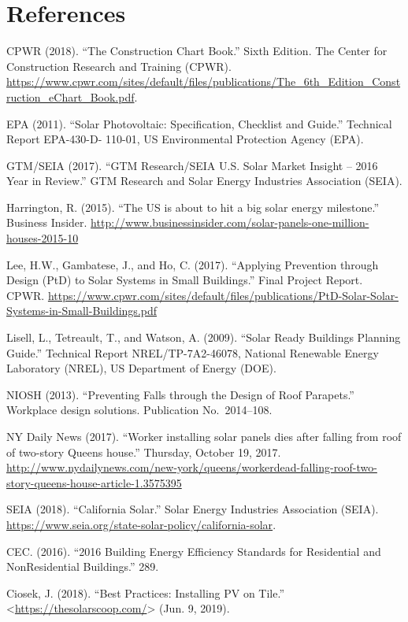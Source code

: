 \documentclass[]{article}
\begin{document}
\hypertarget{references}{%
\section{References}\label{references}}

CPWR (2018). ``The Construction Chart Book.'' Sixth Edition. The Center
for Construction Research and Training (CPWR).
\url{https://www.cpwr.com/sites/default/files/publications/The_6th_Edition_Construction_eChart_Book.pdf}.

EPA (2011). ``Solar Photovoltaic: Specification, Checklist and Guide.''
Technical Report EPA-430-D- 110-01, US Environmental Protection Agency
(EPA).

GTM/SEIA (2017). ``GTM Research/SEIA U.S. Solar Market Insight -- 2016
Year in Review.'' GTM Research and Solar Energy Industries Association
(SEIA).

Harrington, R. (2015). ``The US is about to hit a big solar energy
milestone.'' Business Insider.
\url{http://www.businessinsider.com/solar-panels-one-million-houses-2015-10}

Lee, H.W., Gambatese, J., and Ho, C. (2017). ``Applying Prevention
through Design (PtD) to Solar Systems in Small Buildings.'' Final
Project Report. CPWR.
\url{https://www.cpwr.com/sites/default/files/publications/PtD-Solar-Solar-Systems-in-Small-Buildings.pdf}

Lisell, L., Tetreault, T., and Watson, A. (2009). ``Solar Ready
Buildings Planning Guide.'' Technical Report NREL/TP-7A2-46078, National
Renewable Energy Laboratory (NREL), US Department of Energy (DOE).

NIOSH (2013). ``Preventing Falls through the Design of Roof Parapets.''
Workplace design solutions. Publication No.~2014--108.

NY Daily News (2017). ``Worker installing solar panels dies after
falling from roof of two-story Queens house.'' Thursday, October 19,
2017.
\url{http://www.nydailynews.com/new-york/queens/workerdead-falling-roof-two-story-queens-house-article-1.3575395}

SEIA (2018). ``California Solar.'' Solar Energy Industries Association
(SEIA). \url{https://www.seia.org/state-solar-policy/california-solar}.

\hypertarget{refs}{}
\leavevmode\hypertarget{ref-cec2016BuildingEnergy2016}{}%
CEC. (2016). ``2016 Building Energy Efficiency Standards for Residential
and NonResidential Buildings.'' 289.

\leavevmode\hypertarget{ref-ciosekBestPracticesInstalling2018}{}%
Ciosek, J. (2018). ``Best Practices: Installing PV on Tile.''
\textless{}\url{https://thesolarscoop.com/}\textgreater{} (Jun. 9,
2019).
\end{document}
